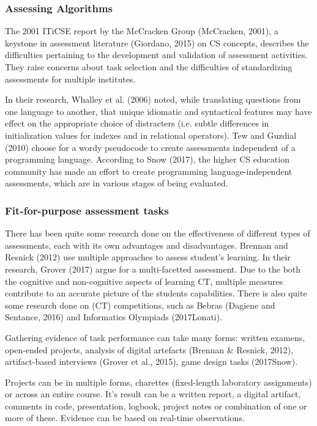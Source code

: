 \subsubsection*{Assessing Algorithms}

The 2001 ITiCSE report by the McCracken Group (McCracken, 2001), a keystone in assessment literature (Giordano, 2015) on CS concepts, describes the difficulties pertaining to the development and validation of assessment activities. They raise concerns about task selection and the difficulties of standardizing assessments for multiple institutes.

In their research, Whalley et al. (2006) noted, while translating questions from one language to another, that unique idiomatic and syntactical features may have effect on the appropriate choice of distracters (i.e. subtle differences in initialization values for indexes and in relational operators). Tew and Guzdial (2010) choose for a wordy pseudocode to create assessments independent of a programming language. According to Snow (2017), the higher CS education community has made an effort to create programming language-independent assessments, which are in various stages of being evaluated.


\subsubsection*{Fit-for-purpose assessment tasks}
There has been quite some research done on the effectiveness of different types of assessments, each with its own advantages and disadvantages. Brennan and Resnick (2012) use multiple approaches to assess student's learning. In their research, Grover (2017) argue for a multi-facetted assessment. Due to the both the cognitive and non-cognitive aspects of learning CT, multiple measures contribute to an accurate picture of the students capabilities. There is also quite some research done on (CT) competitions, such as Bebras (Dagiene and Sentance, 2016) and Informatics Olympiads (2017Lonati).


Gathering evidence of task performance can take many forms: written examens, open-ended projects, analysis of digital artefacts (Brennan \& Resnick, 2012), artifact-based interviews (Grover et al., 2015), game design tasks (2017Snow).


Projects can be in multiple forms, charettes (fixed-length laboratory assignments) or across an entire course. It's result can be a written report, a digital artifact, comments in code, presentation, logbook, project notes or combination of one or more of these. Evidence can be based on real-time observations.

